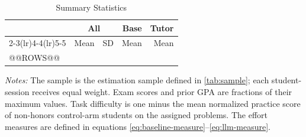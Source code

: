 \begin{table}[htbp]
\centering
\begingroup
{}
\small
\setlength{\tabcolsep}{5pt}
\caption{Summary Statistics}
\label{tab:summary}
\begin{tabular}{lrrrr}
\toprule
 & \multicolumn{2}{c}{All} & Base & Tutor \\
\cmidrule(lr){2-3}\cmidrule(lr){4-4}\cmidrule(lr){5-5}
 & Mean & SD & Mean & Mean \\
\midrule
@@ROWS@@
\bottomrule
\end{tabular}
\par\medskip
\begin{minipage}{\linewidth}
\footnotesize
\textit{Notes:} The sample is the estimation sample defined in \autoref{tab:sample}; each student-session receives equal weight. Exam scores and prior GPA are fractions of their maximum values. Task difficulty is one minus the mean normalized practice score of non-honors control-arm students on the assigned problems. The effort measures are defined in equations \eqref{eq:baseline-measure}--\eqref{eq:llm-measure}.
\end{minipage}
\endgroup
\end{table}
